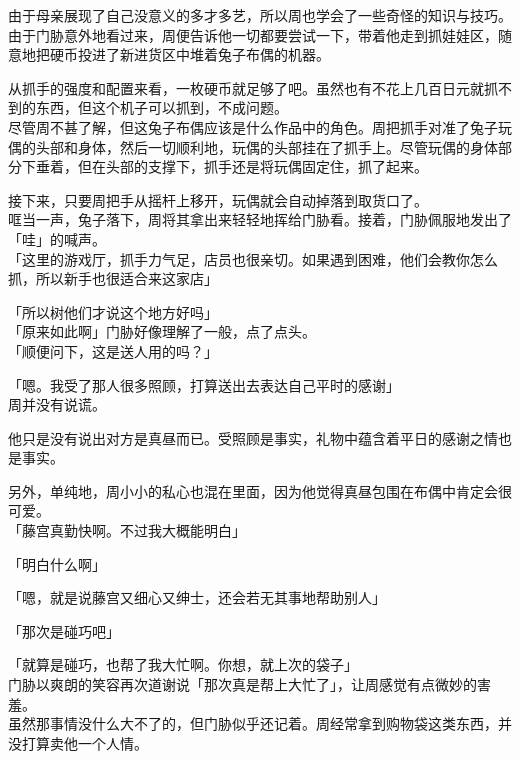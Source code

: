 由于母亲展现了自己没意义的多才多艺，所以周也学会了一些奇怪的知识与技巧。\\

由于门胁意外地看过来，周便告诉他一切都要尝试一下，带着他走到抓娃娃区，随意地把硬币投进了新进货区中堆着兔子布偶的机器。

从抓手的强度和配置来看，一枚硬币就足够了吧。虽然也有不花上几百日元就抓不到的东西，但这个机子可以抓到，不成问题。\\

尽管周不甚了解，但这兔子布偶应该是什么作品中的角色。周把抓手对准了兔子玩偶的头部和身体，然后一切顺利地，玩偶的头部挂在了抓手上。尽管玩偶的身体部分下垂着，但在头部的支撑下，抓手还是将玩偶固定住，抓了起来。

接下来，只要周把手从摇杆上移开，玩偶就会自动掉落到取货口了。\\

哐当一声，兔子落下，周将其拿出来轻轻地挥给门胁看。接着，门胁佩服地发出了「哇」的喊声。\\

「这里的游戏厅，抓手力气足，店员也很亲切。如果遇到困难，他们会教你怎么抓，所以新手也很适合来这家店」

「所以树他们才说这个地方好吗」\\

「原来如此啊」门胁好像理解了一般，点了点头。\\

「顺便问下，这是送人用的吗？」

「嗯。我受了那人很多照顾，打算送出去表达自己平时的感谢」\\

周并没有说谎。

他只是没有说出对方是真昼而已。受照顾是事实，礼物中蕴含着平日的感谢之情也是事实。

另外，单纯地，周小小的私心也混在里面，因为他觉得真昼包围在布偶中肯定会很可爱。\\

「藤宫真勤快啊。不过我大概能明白」

「明白什么啊」

「嗯，就是说藤宫又细心又绅士，还会若无其事地帮助别人」

「那次是碰巧吧」

「就算是碰巧，也帮了我大忙啊。你想，就上次的袋子」\\

门胁以爽朗的笑容再次道谢说「那次真是帮上大忙了」，让周感觉有点微妙的害羞。\\

虽然那事情没什么大不了的，但门胁似乎还记着。周经常拿到购物袋这类东西，并没打算卖他一个人情。\\

